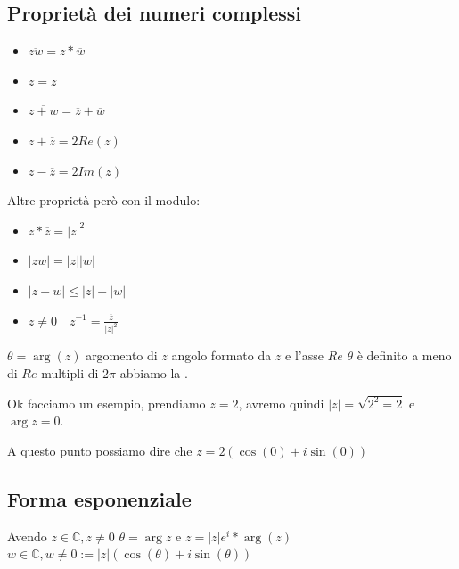 \documentclass{article}
\theoremstyle{definition}
\begin{document}
\subsection{Proprietà dei numeri complessi}
\begin{itemize}
        \item $\overline{zw} = z * \overline{w}$ \\
        \item $\overline{z} = z$ \\
        \item $\overline{z+w} = \overline{z} + \overline{w}$ \\
        \item $z+\overline{z}=2Re(z)$ \\
        \item $z - \overline{z}=2Im(z)$ \\
\end{itemize}

Altre proprietà però con il modulo:
\begin{itemize}
        \item $z * \overline{z} =   |z|^{2}$ \\
        \item $|zw| = |z| |w|$ \\
        \item $|z+w| \le |z| + |w|$ \\
        \item $z \not = 0 \quad z^{-1} = \frac{\overline{z}}{|z|^{2}} $ \\
\end{itemize}


$\theta = \arg(z)$ argomento di $ z $  angolo formato da $ z $  e l'asse $Re$ $\theta$ è definito a meno di $Re$ multipli di $2\pi$ abbiamo la .

Ok facciamo un esempio, prendiamo $z = 2$, avremo quindi $|z| = \sqrt{2^2 = 2}$ e $\arg{z} = 0$.\par
A questo punto possiamo dire che $z = 2(\cos(0) + i\sin(0))$ \newline




\subsection{Forma esponenziale}
Avendo $z \in \mathbb{C}, z \not = 0$ \newline
$\theta = \arg z$ e  $z = | z | e^i*\arg(z)$ \newline
$w \in \mathbb{C}, w \not = 0 := |z| (\cos(\theta) + i\sin(\theta))$ \newline
\end{document}
